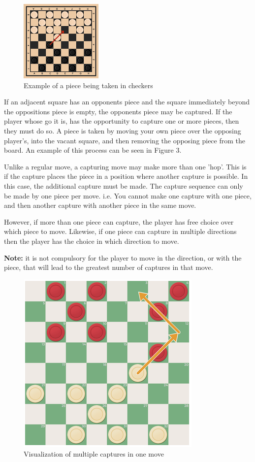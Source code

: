 \documentclass{article}
\begin{document}
    \begin{figure}
        \centering
        \includegraphics[scale=1.15]{piece being taken.png}
        \caption{Example of a piece being taken in checkers}
    \end{figure}
    If an adjacent square has an opponents piece and the square immediately beyond the oppositions piece is empty, the opponents piece may be captured.
    If the player whose go it is, has the opportunity to capture one or more pieces, then they must do so. 
    A piece is taken by moving your own piece over the opposing player's, into the vacant square, and then removing the opposing piece from the board.
    An example of this process can be seen in Figure 3.

    Unlike a regular move, a capturing move may make more than one 'hop'. This is if the capture places the piece in a position where another capture is possible.
    In this case, the additional capture must be made. The capture sequence can only be made by one piece per move. i.e. You cannot make one capture with one piece, 
    and then another capture with another piece in the same move.
    
    However, if more than one piece can capture, the player has free choice over which piece to move. Likewise, if one piece can capture in multiple
    directions then the player has the choice in which direction to move. 
    
    
    \textbf{Note:} it is not compulsory for the player to move in the direction, or with the piece,
    that will lead to the greatest number of captures in that move.
    
    \begin{figure}[h]
        \centering
        \includegraphics[scale=0.6]{double hop.png}
        \caption{Visualization of multiple captures in one move}
    \end{figure}
\end{document}
